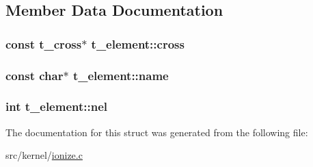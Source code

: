 \subsection{\-Member \-Data \-Documentation}
\hypertarget{structt__element_a4aa9fd44dddf5988c65e2fba1eea27fe}{
\subsubsection[{cross}]{\setlength{\rightskip}{0pt plus 5cm}const {\bf t\-\_\-cross}$\ast$ {\bf t\-\_\-element\-::cross}}}\label{structt__element_a4aa9fd44dddf5988c65e2fba1eea27fe}
\hypertarget{structt__element_a3050bf4f2f2049b4280d161c55f58431}{
\subsubsection[{name}]{\setlength{\rightskip}{0pt plus 5cm}const char$\ast$ {\bf t\-\_\-element\-::name}}}\label{structt__element_a3050bf4f2f2049b4280d161c55f58431}
\hypertarget{structt__element_a01855ba2eb47607f9e9a3162b89eb5b3}{
\subsubsection[{nel}]{\setlength{\rightskip}{0pt plus 5cm}int {\bf t\-\_\-element\-::nel}}}\label{structt__element_a01855ba2eb47607f9e9a3162b89eb5b3}


\-The documentation for this struct was generated from the following file\-:\begin{DoxyCompactItemize}
\item 
src/kernel/\hyperlink{ionize_8c}{ionize.\-c}\end{DoxyCompactItemize}
